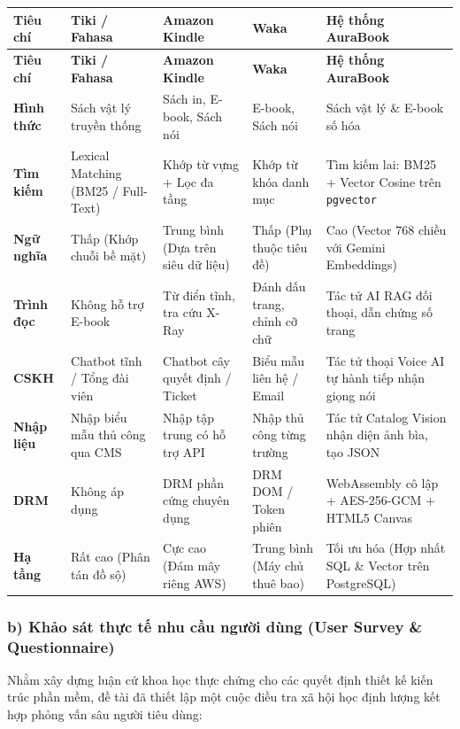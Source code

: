 \documentclass[11pt, a4paper]{report}
\begin{document}
\begin{longtable}{p{2.5cm} p{2.5cm} p{3.0cm} p{2.5cm} p{3.5cm}}
\toprule
\textbf{Tiêu chí} & \textbf{Tiki / Fahasa} & \textbf{Amazon Kindle} & \textbf{Waka} & \textbf{Hệ thống AuraBook} \\
\midrule
\endfirsthead
\toprule
\textbf{Tiêu chí} & \textbf{Tiki / Fahasa} & \textbf{Amazon Kindle} & \textbf{Waka} & \textbf{Hệ thống AuraBook} \\
\midrule
\endhead
\bottomrule
\endfoot
\textbf{Hình thức} & Sách vật lý truyền thống & Sách in, E-book, Sách nói & E-book, Sách nói & Sách vật lý \& E-book số hóa \\
\midrule
\textbf{Tìm kiếm} & Lexical Matching (BM25 / Full-Text) & Khớp từ vựng + Lọc đa tầng & Khớp từ khóa danh mục & Tìm kiếm lai: BM25 + Vector Cosine trên \texttt{pgvector} \\
\midrule
\textbf{Ngữ nghĩa} & Thấp (Khớp chuỗi bề mặt) & Trung bình (Dựa trên siêu dữ liệu) & Thấp (Phụ thuộc tiêu đề) & Cao (Vector 768 chiều với Gemini Embeddings) \\
\midrule
\textbf{Trình đọc} & Không hỗ trợ E-book & Từ điển tĩnh, tra cứu X-Ray & Đánh dấu trang, chỉnh cỡ chữ & Tác tử AI RAG đối thoại, dẫn chứng số trang \\
\midrule
\textbf{CSKH} & Chatbot tĩnh / Tổng đài viên & Chatbot cây quyết định / Ticket & Biểu mẫu liên hệ / Email & Tác tử thoại Voice AI tự hành tiếp nhận giọng nói \\
\midrule
\textbf{Nhập liệu} & Nhập biểu mẫu thủ công qua CMS & Nhập tập trung có hỗ trợ API & Nhập thủ công từng trường & Tác tử Catalog Vision nhận diện ảnh bìa, tạo JSON \\
\midrule
\textbf{DRM} & Không áp dụng & DRM phần cứng chuyên dụng & DRM DOM / Token phiên & WebAssembly cô lập + AES-256-GCM + HTML5 Canvas \\
\midrule
\textbf{Hạ tầng} & Rất cao (Phân tán đồ sộ) & Cực cao (Đám mây riêng AWS) & Trung bình (Máy chủ thuê bao) & Tối ưu hóa (Hợp nhất SQL \& Vector trên PostgreSQL) \\
\bottomrule
\end{longtable}

\subsubsection{b) Khảo sát thực tế nhu cầu người dùng (User Survey \& Questionnaire)}

Nhằm xây dựng luận cứ khoa học thực chứng cho các quyết định thiết kế kiến trúc phần mềm, đề tài đã thiết lập một cuộc điều tra xã hội học định lượng kết hợp phỏng vấn sâu người tiêu dùng:
\end{document}
